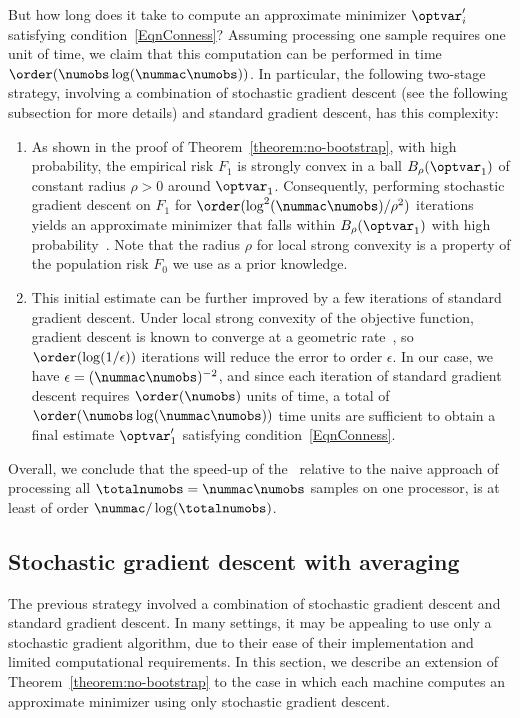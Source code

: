 \documentclass[11pt,twoside]{article}
\theoremstyle{definition}
\begin{document}
But how long does it take to compute an approximate minimizer
$\optvar'_i$ satisfying condition~\eqref{EqnConness}?
Assuming processing one sample requires one unit of time, we claim
that this computation can be performed in time $\order(\numobs
\log(\nummac \numobs))$.  In particular, the following two-stage
strategy, involving a combination of stochastic gradient descent (see
the following subsection for more details) and standard gradient
descent, has this complexity:
\begin{enumerate}
\item[(1)] As shown in the proof of
  Theorem~\ref{theorem:no-bootstrap}, with high probability, the
  empirical risk $F_1$ is strongly convex in a ball
  $B_\rho(\optvar_1)$ of constant radius $\rho > 0$ around
  $\optvar_1$.  Consequently, performing stochastic gradient descent
  on $F_1$ for $\order(\log^2(\nummac \numobs) / \rho^2)$ iterations
  yields an approximate minimizer that falls within
  $B_\rho(\optvar_1)$ with high probability~\citep[e.g.][Proposition
    2.1]{NemirovskiJuLaSh09}. Note that the radius $\rho$ for local
  strong convexity is a property of the population risk $F_0$ we
  use as a prior knowledge.
%
\item[(2)] This initial estimate can be further improved by a few iterations
  of standard gradient descent.  Under local strong convexity of the objective
  function, gradient descent is known to converge at a geometric
  rate~\citep[see, e.g.][]{NocedalWr06,BoydVa04}, so
  $\order(\log(1/\epsilon))$ iterations will reduce the error to order
  $\epsilon$.  In our case, we have $\epsilon = (\nummac \numobs)^{-2}$, and
  since each iteration of standard gradient descent requires $\order(\numobs)$
  units of time, a total of $\order(\numobs \log(\nummac \numobs))$ time units
  are sufficient to obtain a final estimate $\optvar_1'$ satisfying
  condition~\eqref{EqnConness}.
\end{enumerate}

\noindent Overall, we conclude that the speed-up of the \avgm\,
relative to the naive approach of processing all $\totalnumobs =
\nummac \numobs$ samples on one processor, is at least of order
$\nummac / \log(\totalnumobs)$.

\subsection{Stochastic gradient descent with averaging}

The previous strategy involved a combination of stochastic gradient
descent and standard gradient descent.  In many settings, it may be
appealing to use only a stochastic gradient algorithm, due to their
ease of their implementation and limited computational requirements.
In this section, we describe an extension of
Theorem~\ref{theorem:no-bootstrap} to the case in which each machine
computes an approximate minimizer using only stochastic gradient descent.
\end{document}
